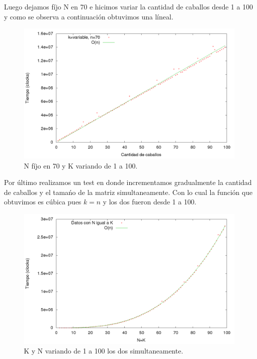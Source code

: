 Luego dejamos f\'ijo N en 70 e hicimos variar la cantidad de caballos desde 1 a 100 y como se observa a continuaci\'on obtuvimos una l\'ineal.

\begin{figure}[H]
\begin{center}
\includegraphics[scale=0.35]{./imagenes/ej2_chartRendimiento2.png}
\caption{N f\'ijo en 70 y K variando de 1 a 100.}
\end{center}
\end{figure}

Por \'ultimo realizamos un test en donde incrementamos gradualmente la cantidad de caballos y el tama\'no de la matriz simultaneamente. Con lo cual la funci\'on que obtuvimos es c\'ubica pues $k = n$ y los dos fueron desde 1 a 100.


\begin{figure}[H]
\begin{center}
\includegraphics[scale=0.35]{./imagenes/ej2_chartRendimiento3.png}
\caption{K y N variando de 1 a 100 los dos simultaneamente.}
\end{center}
\end{figure}